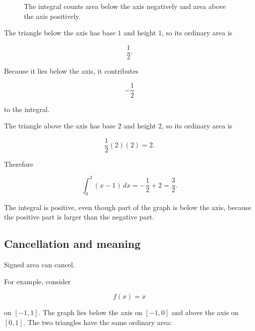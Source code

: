 \begin{figure}[h]
\centering
{}
\caption{The integral counts area below the axis negatively and area above the axis positively.}
\label{fig:signed-area-linear}
\end{figure}

The triangle below the axis has base \(1\) and height \(1\), so its ordinary area is

\[
\frac12.
\]

Because it lies below the axis, it contributes

\[
-\frac12
\]

to the integral.

The triangle above the axis has base \(2\) and height \(2\), so its ordinary area is

\[
\frac12(2)(2)=2.
\]

Therefore

\[
\int_0^3 (x-1)\,dx
=
-\frac12+2
=
\frac32.
\]

The integral is positive, even though part of the graph is below the axis, because the
positive part is larger than the negative part.

\subsection{Cancellation and meaning}
\label{subsec:cancellation-meaning}

Signed area can cancel.

For example, consider

\[
f(x)=x
\]

on \([-1,1]\).  The graph lies below the axis on \([-1,0]\) and above the axis on
\([0,1]\).  The two triangles have the same ordinary area:

